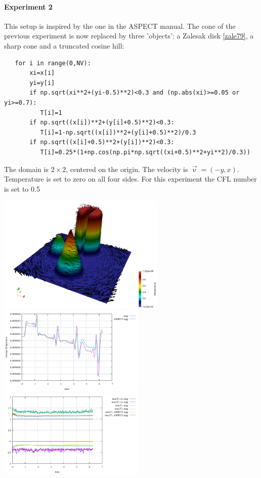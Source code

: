 \paragraph{Experiment 2}

This setup is inspired by the one in the ASPECT manual. The cone of the previous 
experiment is now replaced by three 'objects': a Zalesak disk \ref{zale79}, a sharp cone and a truncated cosine hill:

\begin{lstlisting}
   for i in range(0,NV):
       xi=x[i]
       yi=y[i]
       if np.sqrt(xi**2+(yi-0.5)**2)<0.3 and (np.abs(xi)>=0.05 or yi>=0.7):
          T[i]=1
       if np.sqrt((x[i])**2+(y[i]+0.5)**2)<0.3:
          T[i]=1-np.sqrt((x[i])**2+(y[i]+0.5)**2)/0.3
       if np.sqrt((x[i]+0.5)**2+(y[i])**2)<0.3:
          T[i]=0.25*(1+np.cos(np.pi*np.sqrt((xi+0.5)**2+yi**2)/0.3))
\end{lstlisting}

The domain is $2\times2$, centered on the origin. The velocity is $\vec\upnu=(-y,x)$. Temperature 
is set to zero on all four sides.
For this experiment the CFL number is set to 0.5

\begin{center}
\includegraphics[width=8cm]{python_codes/fieldstone_43/results/experiment2/buildings}\\
\includegraphics[width=7cm]{python_codes/fieldstone_43/results/experiment2/avrg_T}
\includegraphics[width=7cm]{python_codes/fieldstone_43/results/experiment2/stats_T}
\end{center}

